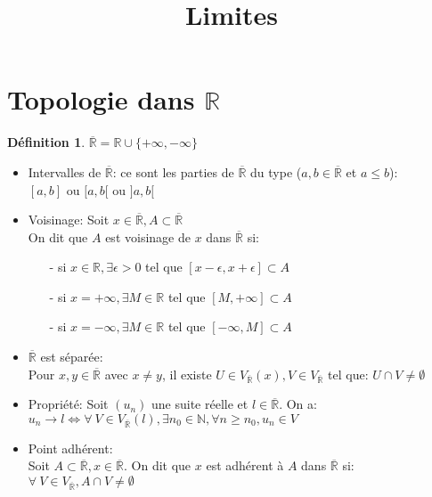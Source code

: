 \documentclass[fleqn]{article}
\title{Limites}
\date{}
\theoremstyle{definition} \newtheorem*{defi}{D\'efinition}
\theoremstyle{definition} \newtheorem*{theo}{Th\'eor\`eme}
\theoremstyle{definition} \newtheorem*{adh}{Caract\'erisation s\'equentielle de l'adh\'erence}
\theoremstyle{remark} \newtheorem*{rqs}{Remarques}
\begin{document}
\maketitle

\section{Topologie dans $\mathbb{R}$}
\begin{defi}
	$\overline{\mathbb{R}} = \mathbb{R} \cup \{ +\infty, -\infty\}$
\end{defi}
\begin{itemize}
	\item Intervalles de $\overline{\mathbb{R}}$: ce sont les parties de $\overline{\mathbb{R}}$ du type ($a,b \in \overline{\mathbb{R}}$ et
		$a \leq b$): \\
		$[a,b]$ ou $[a,b[$ ou $]a,b[$
	\item Voisinage: Soit $x \in \overline{\mathbb{R}}, A \subset \overline{\mathbb{R}}$ \\
		On dit que $A$ est voisinage de $x$ dans $\overline{\mathbb{R}}$ si:
		\begin{itemize}
			\item[-] si $x \in \mathbb{R}, \exists \epsilon > 0$ tel que $[x - \epsilon, x + \epsilon] \subset A$
			\item[-] si $x = +\infty, \exists M \in \mathbb{R}$ tel que $[M, +\infty] \subset A$
			\item[-] si $x = - \infty, \exists M \in \mathbb{R}$ tel que $[-\infty, M] \subset A$
		\end{itemize}
	\item $\overline{\mathbb{R}}$ est s\'epar\'ee: \\
		Pour $x, y \in \overline{\mathbb{R}}$ avec $x \neq y$, il existe $U \in V_{\overline{\mathbb{R}}}(x), V \in V_{\overline{\mathbb{R}}}$
		tel que: $U \cap V \neq \emptyset$
	\item Propri\'et\'e: Soit $(u_n)$ une suite r\'eelle et $l \in \overline{\mathbb{R}}$. On a: \\
		$u_n \rightarrow l \Leftrightarrow \forall\ V \in V_{\overline{\mathbb{R}}}(l), \exists n_0 \in \mathbb{N}, \forall n \geq n_0, u_n
		\in V$
	\item Point adh\'erent: \\
		Soit $A \subset \overline{\mathbb{R}}, x \in \overline{\mathbb{R}}$. On dit que $x$ est adh\'erent \`a $A$ dans
		$\overline{\mathbb{R}}$ si: \\
		$\forall\ V \in V_{\overline{\mathbb{R}}}, A \cap V \neq \emptyset$
\end{itemize}
\end{document}
